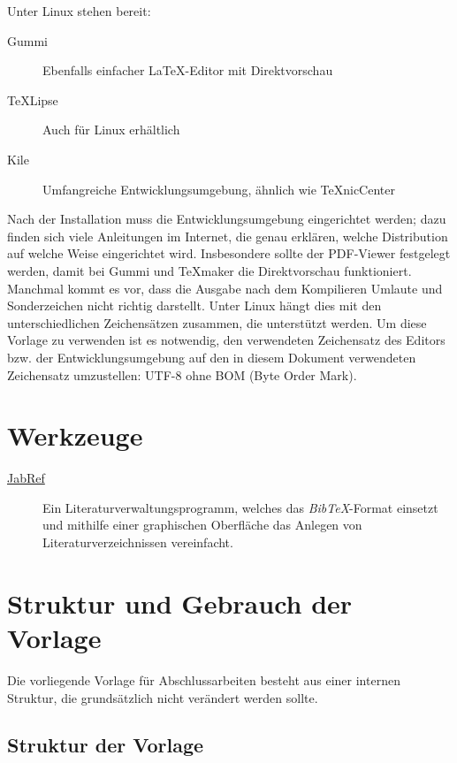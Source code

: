 Unter Linux stehen bereit:

\begin{description}
 \item [Gummi] Ebenfalls einfacher LaTeX-Editor mit Direktvorschau
 \item [TeXLipse] Auch für Linux erhältlich
 \item [Kile] Umfangreiche Entwicklungsumgebung, ähnlich wie TeXnicCenter
\end{description}

Nach der Installation muss die Entwicklungsumgebung eingerichtet werden; dazu finden sich viele Anleitungen im Internet, die genau erklären, welche Distribution
auf welche Weise eingerichtet wird. Insbesondere sollte der PDF-Viewer festgelegt werden, damit bei Gummi und TeXmaker die Direktvorschau funktioniert. Manchmal kommt es vor, dass die Ausgabe 
nach dem Kompilieren Umlaute und Sonderzeichen nicht richtig darstellt. Unter Linux hängt dies mit den unterschiedlichen Zeichensätzen zusammen, die unterstützt
werden. Um diese Vorlage zu verwenden ist es notwendig, den verwendeten Zeichensatz des Editors bzw. der Entwicklungsumgebung auf den in diesem Dokument
verwendeten Zeichensatz umzustellen: UTF-8 ohne BOM (Byte Order Mark).

\section{Werkzeuge}
\label{sec:Werkzeuge}

\begin{description}
 \item [\href{http://jabref.sourceforge.net/}{JabRef}] Ein Literaturverwaltungsprogramm, welches das \textit{BibTeX}-Format einsetzt
 und mithilfe einer graphischen Oberfläche das Anlegen von Literaturverzeichnissen vereinfacht.
 
\end{description}

\section{Struktur und Gebrauch der Vorlage}

Die vorliegende Vorlage für Abschlussarbeiten besteht aus einer internen Struktur, die grundsätzlich nicht verändert werden sollte. %

\subsection{Struktur der Vorlage}
\label{subsec:strukturvorlage}

